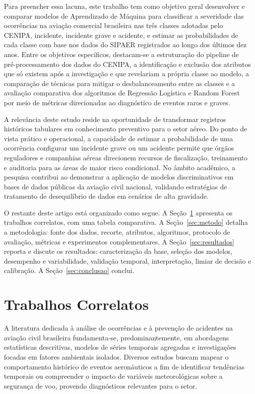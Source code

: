 \documentclass[12pt]{article}
\begin{document}
Para preencher essa lacuna, este trabalho tem como objetivo geral desenvolver e comparar modelos de Aprendizado de Máquina para classificar a severidade das ocorrências na aviação comercial brasileira nas três classes adotadas pelo CENIPA, incidente, incidente grave e acidente, e estimar as probabilidades de cada classe com base nos dados do SIPAER registrados ao longo dos últimos dez anos. Entre os objetivos específicos, destacam-se a estruturação do pipeline de pré-processamento dos dados do CENIPA, a identificação e exclusão dos atributos que só existem após a investigação e que revelariam a própria classe ao modelo, a comparação de técnicas para mitigar o desbalanceamento entre as classes e a avaliação comparativa dos algoritmos de Regressão Logística e Random Forest por meio de métricas direcionadas ao diagnóstico de eventos raros e graves.

A relevância deste estudo reside na oportunidade de transformar registros históricos tabulares em conhecimento preventivo para o setor aéreo. Do ponto de vista prático e operacional, a capacidade de estimar a probabilidade de uma ocorrência configurar um incidente grave ou um acidente permite que órgãos reguladores e companhias aéreas direcionem recursos de fiscalização, treinamento e auditoria para as áreas de maior risco condicional. No âmbito acadêmico, a pesquisa contribui ao demonstrar a aplicação de modelos discriminativos em bases de dados públicas da aviação civil nacional, validando estratégias de tratamento de desequilíbrio de dados em cenários de alta gravidade.

O restante deste artigo está organizado como segue. A Seção~\ref{sec:correlatos} apresenta os trabalhos correlatos, com uma tabela comparativa. A Seção~\ref{sec:metodo} detalha a metodologia: fonte dos dados, recorte, atributos, algoritmos, protocolo de avaliação, métricas e experimentos complementares. A Seção~\ref{sec:resultados} reporta e discute os resultados: caracterização da base, seleção dos modelos, desempenho e variabilidade, validação temporal, interpretação, limiar de decisão e calibração. A Seção~\ref{sec:conclusao} conclui.

\section{Trabalhos Correlatos}
\label{sec:correlatos}

A literatura dedicada à análise de ocorrências e à prevenção de acidentes na aviação civil brasileira fundamenta-se, predominantemente, em abordagens estatísticas descritivas, modelos de séries temporais agregadas e investigações focadas em fatores ambientais isolados. Diversos estudos buscam mapear o comportamento histórico de eventos aeronáuticos a fim de identificar tendências temporais ou compreender o impacto de variáveis meteorológicas sobre a segurança de voo, provendo diagnósticos relevantes para o setor.
\end{document}
